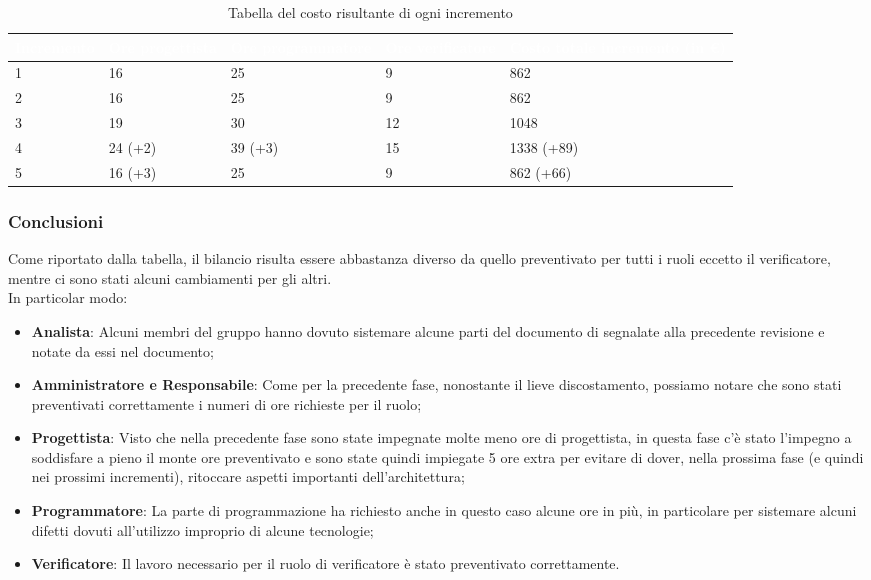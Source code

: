 {
\renewcommand{\arraystretch}{1.65}
\centering
\begin{longtable}{ C{2.1cm} C{2.7cm} C{3cm} C{3cm} C{3.3cm} }
\caption{Tabella del costo risultante di ogni incremento}\\
\textcolor{white}{\textbf{Incremento}} & 
\textcolor{white}{\textbf{Ore progettista}} &
\textcolor{white}{\textbf{Ore programmatore}}&
\textcolor{white}{\textbf{Ore verificatore}}&
\textcolor{white}{\textbf{Costo totale incremento (in \euro{})}}\\
\endhead

1 & 16      & 25      &  9 &  862       \\
2 & 16      & 25      &  9 &  862       \\
3 & 19      & 30      & 12 & 1048       \\
4 & 24 (+2) & 39 (+3) & 15 & 1338 (+89) \\
5 & 16 (+3) & 25      &  9 &  862 (+66) \\

\end{longtable}
}

\subsubsection{Conclusioni}
Come riportato dalla tabella, il bilancio risulta essere abbastanza diverso da quello preventivato per tutti i ruoli eccetto il verificatore, mentre ci sono stati alcuni cambiamenti per gli altri. \\
In particolar modo:
\begin{itemize}
    \item \textbf{Analista}: Alcuni membri del gruppo hanno dovuto sistemare alcune parti del documento di \AdR{} segnalate alla precedente revisione e notate da essi nel documento;
	\item \textbf{Amministratore e Responsabile}: Come per la precedente fase, nonostante il lieve discostamento, possiamo notare che sono stati preventivati correttamente i numeri di ore richieste per il ruolo;
    \item \textbf{Progettista}: Visto che nella precedente fase sono state impegnate molte meno ore di progettista, in questa fase c'è stato l'impegno a soddisfare a pieno il monte ore preventivato e sono state quindi impiegate 5 ore extra per evitare di dover, nella prossima fase (e quindi nei prossimi incrementi), ritoccare aspetti importanti dell'architettura;
    \item \textbf{Programmatore}: La parte di programmazione ha richiesto anche in questo caso alcune ore in più, in particolare per sistemare alcuni difetti dovuti all'utilizzo improprio di alcune tecnologie;
	\item \textbf{Verificatore}: Il lavoro necessario per il ruolo di verificatore è stato preventivato correttamente. 
\end{itemize}
